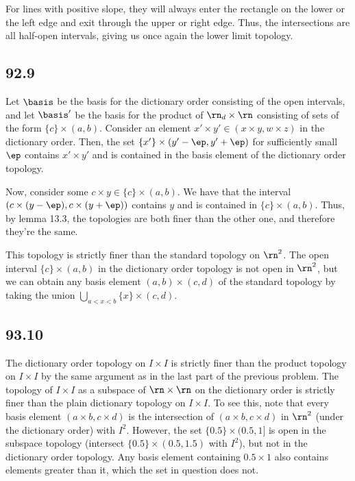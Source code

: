 \documentclass{article}
\begin{document}
For lines with positive slope, they will always enter the rectangle on the lower or the left edge and exit through the upper or right edge. Thus, the intersections are all half-open intervals, giving us once again the lower limit topology.
\subsection*{92.9}
Let $\basis$ be the basis for the dictionary order consisting of the open intervals, and let $\basis'$ be the basis for the product of $\rn_d\times\rn$ consisting of sets of the form $\{c\}\times(a,b)$. Consider an element $x'\times y'\in(x\times y,w\times z)$ in the dictionary order. Then, the set $\{x'\}\times(y'-\ep,y'+\ep)$ for sufficiently small $\ep$ contains $x'\times y'$ and is contained in the basis element of the dictionary order topology. 

Now, consider some $c\times y\in\{c\}\times(a,b)$. We have that the interval $(c\times (y-\ep),c\times (y+\ep))$ contains $y$ and is contained in $\{c\}\times(a,b)$. Thus, by lemma 13.3, the topologies are both finer than the other one, and therefore they're the same.

This topology is strictly finer than the standard topology on $\rn^2$. The open interval $\{c\}\times(a,b)$ in the dictionary order topology is not open in $\rn^2$, but we can obtain any basis element $(a,b)\times(c,d)$ of the standard topology by taking the union $\bigcup_{a<x<b}\{x\}\times(c,d)$.
\subsection*{93.10}
The dictionary order topology on $I\times I$ is strictly finer than the product topology on $I\times I$ by the same argument as in the last part of the previous problem. The topology of $I\times I$ as a subspace of $\rn\times\rn$ on the dictionary order is strictly finer than the plain dictionary topology on $I\times I$. To see this, note that every basis element $(a\times b,c\times d)$ is the intersection of $(a\times b,c\times d)$ in $\rn^2$ (under the dictionary order) with $I^2$. However, the set $\{0.5\}\times(0.5,1]$ is open in the subspace topology (intersect $\{0.5\}\times(0.5,1.5)$ with $I^2$), but not in the dictionary order topology. Any basis element containing $0.5\times 1$ also contains elements greater than it, which the set in question does not.
\end{document}
